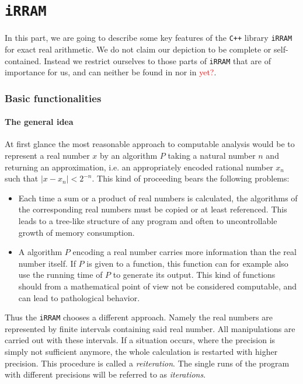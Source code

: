 \documentclass{article}
\newcommand{\irram}{\texttt{iRRAM}\xspace}
\newcommand{\cc}{\texttt{C++}\xspace}
\newcommand{\temp}[1]{\textcolor{red}{#1}}
\begin{document}
\part{\irram}

In this part, we are going to describe some key features of the \cc library \irram for exact real arithmetic. We do not claim our depiction to be complete or self-contained. Instead we restrict ourselves to those parts of \irram that are of importance for us, and can neither be found in \cite{} nor in \cite{} \temp{yet?}.

\section{Basic functionalities}

\subsection{The general idea}

At first glance the most reasonable approach to computable analysis would be to represent a real number $x$ by an algorithm $P$ taking a natural number $n$ and returning an approximation, i.e. an appropriately encoded rational number $x_n$ such that $|x-x_n|<2^{-n}$. This kind of proceeding bears the following problems:
\begin{itemize}
\item Each time a sum or a product of real numbers is calculated, the algorithms of the corresponding real numbers must be copied or at least referenced. This leads to a tree-like structure of any program and often to uncontrollable growth of memory consumption.
\item A algorithm $P$ encoding a real number carries more information than the real number itself. If $P$ is given to a function, this function can for example also use the running time of $P$ to generate its output. This kind of functions should from a mathematical point of view not be considered computable, and can lead to pathological behavior.
\end{itemize}

Thus the \irram chooses a different approach. Namely the real numbers are represented by finite intervals containing said real number. All manipulations are carried out with these intervals. If a situation occurs, where the precision is simply not sufficient anymore, the whole calculation is restarted with higher precision. This procedure is called a \emph{reiteration}. The single runs of the program with different precisions will be referred to as \emph{iterations}.
\end{document}
